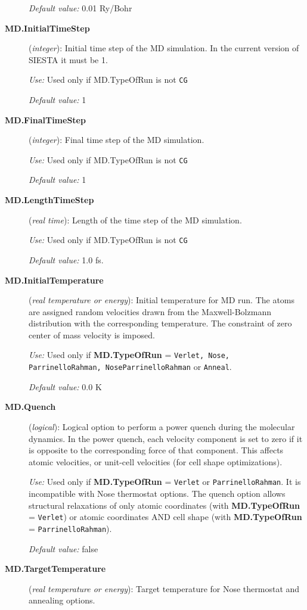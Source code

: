 \begin{description}
{\it Default value:} 0.01 Ry/Bohr
   
\item[{\bf MD.InitialTimeStep}] ({\it integer}): 
Initial time step of the MD simulation.
In the current version of SIESTA it must be 1.

{\it Use:} Used only if MD.TypeOfRun is not {\tt CG}
    
{\it Default value:} 1

\item[{\bf MD.FinalTimeStep}] ({\it integer}): Final time step of 
the MD simulation.

{\it Use:} Used only if MD.TypeOfRun is not {\tt CG}
    
{\it Default value:} 1

\item[{\bf MD.LengthTimeStep}] ({\it real time}): Length of the time step
of the MD simulation.

{\it Use:} Used only if MD.TypeOfRun is not {\tt CG}
    
{\it Default value:} 1.0 fs.

\item[{\bf MD.InitialTemperature}] ({\it real temperature or energy}): 
Initial temperature for MD run. The atoms are assigned random 
velocities drawn from the Maxwell-Bolzmann distribution with the
corresponding temperature. The constraint of zero center of
mass velocity is imposed.

{\it Use:} Used only if {\bf MD.TypeOfRun} = {\tt Verlet, Nose, 
ParrinelloRahman, NoseParrinelloRahman}
or {\tt Anneal}.

{\it Default value:} 0.0 K

\item[{\bf MD.Quench}] ({\it logical}): Logical option to perform a
power quench during the molecular dynamics. 
In the power quench, each velocity component is set to
zero if it is opposite to the corresponding force
of that component. This affects atomic velocities,
or unit-cell velocities (for cell shape optimizations).

{\it Use:} Used only if {\bf MD.TypeOfRun} = {\tt Verlet} or 
{\tt ParrinelloRahman}.
It is incompatible with Nose thermostat options.
The quench option allows structural relaxations of
only atomic coordinates (with {\bf MD.TypeOfRun} = {\tt Verlet})
or atomic coordinates AND cell shape 
(with {\bf MD.TypeOfRun} = {\tt ParrinelloRahman}).

{\it Default value:} false

\item[{\bf MD.TargetTemperature}] ({\it real temperature or energy}): 
Target temperature for Nose thermostat and annealing options.


\end{description}
